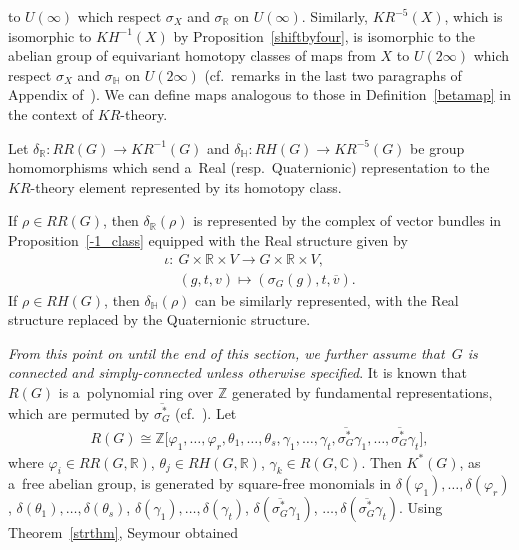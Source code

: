 to $U(\infty)$ which respect $\sigma_X$ and $\sigma_\mathbb{R}$ on $U(\infty)$.
Similarly, $KR^{-5}(X)$, which is isomorphic to $KH^{-1}(X)$ by Proposition~\ref{shiftbyfour}, is isomorphic to the
abelian group of equivariant homotopy classes of maps from $X$ to $U(2\infty)$
which respect $\sigma_X$ and $\sigma_\mathbb{H}$ on $U(2\infty)$
(cf.\ remarks in the last two paragraphs of Appendix of~\cite{Se}).
We can def\/ine maps analogous to those in Def\/inition~\ref{betamap} in the context of $KR$-theory.
\begin{Definition}
Let $\delta_\mathbb{R}: RR(G)\to KR^{-1}(G)$ and $\delta_\mathbb{H}: RH(G)\to KR^{-5}(G)$ be group homomorphisms which
send a~Real (resp.\
Quaternionic) representation to the $KR$-theory element represented by its homotopy class.
\end{Definition}
\begin{Proposition}
If $\rho\in RR(G)$, then $\delta_\mathbb{R}(\rho)$ is represented by the complex of vector bundles in
Proposition~{\rm \ref{-1_class}} equipped with the Real structure given by
\begin{gather*}
\iota: \ G\times\mathbb{R}\times V  \to  G\times\mathbb{R}\times V,
\\
\phantom{\iota: {}} \
(g, t, v)  \mapsto  (\sigma_G(g), t, \overline{v}).
\end{gather*}
If $\rho\in RH(G)$, then $\delta_\mathbb{H}(\rho)$ can be similarly represented, with the Real structure replaced by the
Quaternionic structure.
\end{Proposition}

\emph{From this point on until the end of this section, we further assume that~$G$ is connected and simply-connected unless
otherwise specified}.
It is known that $R(G)$ is a~polynomial ring over $\mathbb{Z}$ generated by fundamental representations, which are
permuted by $\overline{\sigma_{G}^*}$ (cf.\ \cite[Lemma~5.5]{Se}).
Let
\begin{gather*}
R(G)\cong\mathbb{Z}\big[\varphi_1, \dots, \varphi_r, \theta_1, \dots, \theta_s, \gamma_1, \dots, \gamma_t, \overline{\sigma_G^*}
\gamma_1, \dots, \overline{\sigma_G^*}\gamma_t\big],
\end{gather*}
where $\varphi_i\in RR(G, \mathbb{R})$, $\theta_j\in RH(G, \mathbb{R})$, $\gamma_k\in R(G, \mathbb{C})$.
Then $K^*(G)$, as a~free abelian group, is generated by square-free monomials
in $\delta(\varphi_1), {\dots},\delta(\varphi_r)$,
$\delta(\theta_1), {\dots}, \delta(\theta_s)$,
$\delta(\gamma_1), {\dots}, \delta(\gamma_t)$,
$\delta(\overline{\sigma_G^*}\gamma_1)$, ${\dots}, \delta(\overline{\sigma_G^*}\gamma_t)$.
Using Theorem~\ref{strthm}, Seymour obtained

